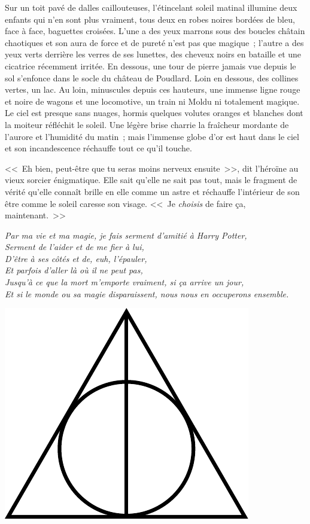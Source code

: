 Sur un toit pavé de dalles caillouteuses, l'étincelant soleil matinal illumine deux enfants qui n'en sont plus vraiment, tous deux en robes noires bordées de bleu, face à face, baguettes croisées. L'une a des yeux marrons sous des boucles châtain chaotiques et son aura de force et de pureté n'est pas que magique~; l'autre a des yeux verts derrière les verres de ses lunettes, des cheveux noirs en bataille et une cicatrice récemment irritée. En dessous, une tour de pierre jamais vue depuis le sol s'enfonce dans le socle du château de Poudlard. Loin en dessous, des collines vertes, un lac. Au loin, minuscules depuis ces hauteurs, une immense ligne rouge et noire de wagons et une locomotive, un train ni Moldu ni totalement magique. Le ciel est presque sans nuages, hormis quelques volutes oranges et blanches dont la moiteur réfléchit le soleil. Une légère brise charrie la fraîcheur mordante de l'aurore et l'humidité du matin~; mais l'immense globe d'or est haut dans le ciel et son incandescence réchauffe tout ce qu'il touche.

<<~Eh bien, peut-être que tu seras moins nerveux ensuite~>>, dit l'héroïne au vieux sorcier énigmatique. Elle sait qu'elle ne sait pas tout, mais le fragment de vérité qu'elle connaît brille en elle comme un astre et réchauffe l'intérieur de son être comme le soleil caresse son visage. <<~Je \emph{choisis} de faire ça, maintenant.~>>

\emph{Par ma vie et ma magie, je fais serment d'amitié à Harry Potter,\\ Serment de l'aider et de me fier à lui,\\ D'être à ses côtés et de, euh, l'épauler,\\ Et parfois d'aller là où il ne peut pas,\\ Jusqu'à ce que la mort m'emporte vraiment, si ça arrive un jour,\\ Et si le monde ou sa magie disparaissent, nous nous en occuperons ensemble.}
\vspace*{\fill}
{
\begin{center}
\includegraphics[scale=0.75]{Deathly_Hallows_Sign.pdf}
\end{center}
}
\vspace*{\fill}
\clearpage

